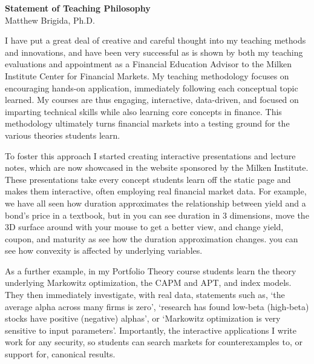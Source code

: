\documentclass[12pt]{article}
\begin{document}
\begin{center}
{\bf Statement of Teaching Philosophy} \\
Matthew Brigida, Ph.D.
\end{center}
\vspace*{1cm}
I have put a great deal of creative and careful thought into my teaching methods and innovations, and have been very successful as is shown by both my teaching evaluations and appointment as a Financial Education Advisor to the Milken Institute Center for Financial Markets.  My teaching methodology focuses on encouraging hands-on application, immediately following each conceptual topic learned. My courses are thus engaging, interactive, data-driven, and focused on imparting technical skills while also learning core concepts in finance.  This methodology ultimately turns financial markets into a testing ground for the various theories students learn.  

To foster this approach I started creating interactive presentations and lecture notes, which are now showcased in the \href{https://5MinuteFinance.org}{\color{Blue}{5MinuteFinance.org}} website sponsored by the Milken Institute.  These presentations take every concept students learn off the static page and makes them interactive, often employing real financial market data. For example, we have all seen how duration approximates the relationship between yield and a bond's price in a textbook, but in \href{https://micfm.shinyapps.io/intro_duration/}{\color{Blue}{this presentation (slide 8)}} you can see duration in 3 dimensions, move the 3D surface around with your mouse to get a better view, and change yield, coupon, and maturity as see how the duration approximation changes.  \href{https://micfm.shinyapps.io/convexity/}{\color{Blue}{Here}} you can see how convexity is affected by underlying variables.

As a further example, in my Portfolio Theory course students learn the theory underlying Markowitz optimization, the CAPM and APT, and index models. They then immediately investigate, with real data, statements such as, `the average alpha across many firms is zero', `research has found low-beta (high-beta) stocks have positive (negative) alphas', or `Markowitz optimization is very sensitive to input parameters'.  Importantly, the interactive applications I write work for any security, so students can search markets for counterexamples to, or support for, canonical results.

\end{document}
